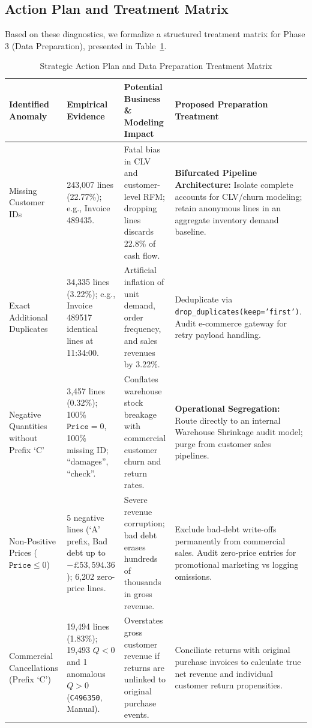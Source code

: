 \documentclass[journal,10pt,twocolumn]{IEEEtran}
\begin{document}
\subsection{Action Plan and Treatment Matrix}
Based on these diagnostics, we formalize a structured treatment matrix for Phase 3 (Data Preparation), presented in Table~\ref{tab:action_plan}.

\begin{table}[htbp]
\caption{Strategic Action Plan and Data Preparation Treatment Matrix}
\label{tab:action_plan}
\centering
\begin{tabularx}{\textwidth}{p{2.8cm}p{2.8cm}p{4.0cm}X}
\toprule
\textbf{Identified Anomaly} & \textbf{Empirical Evidence} & \textbf{Potential Business \& Modeling Impact} & \textbf{Proposed Preparation Treatment} \\
\midrule
Missing Customer IDs & 243,007 lines (22.77\%); e.g., Invoice 489435. & Fatal bias in CLV and customer-level RFM; dropping lines discards 22.8\% of cash flow. & \textbf{Bifurcated Pipeline Architecture:} Isolate complete accounts for CLV/churn modeling; retain anonymous lines in an aggregate inventory demand baseline. \\
\midrule
Exact Additional Duplicates & 34,335 lines (3.22\%); e.g., Invoice 489517 identical lines at 11:34:00. & Artificial inflation of unit demand, order frequency, and sales revenues by 3.22\%. & Deduplicate via \texttt{drop\_duplicates(keep='first')}. Audit e-commerce gateway for retry payload handling. \\
\midrule
Negative Quantities without Prefix `C' & 3,457 lines (0.32\%); 100\% $\texttt{Price} = 0$, 100\% missing ID; ``damages'', ``check''. & Conflates warehouse stock breakage with commercial customer churn and return rates. & \textbf{Operational Segregation:} Route directly to an internal Warehouse Shrinkage audit model; purge from customer sales pipelines. \\
\midrule
Non-Positive Prices ($\texttt{Price} \le 0$) & 5 negative lines (`A' prefix, Bad debt up to $-\pounds 53,594.36$); 6,202 zero-price lines. & Severe revenue corruption; bad debt erases hundreds of thousands in gross revenue. & Exclude bad-debt write-offs permanently from commercial sales. Audit zero-price entries for promotional marketing vs logging omissions. \\
\midrule
Commercial Cancellations (Prefix `C') & 19,494 lines (1.83\%); 19,493 $Q < 0$ and 1 anomalous $Q > 0$ (\texttt{C496350}, Manual). & Overstates gross customer revenue if returns are unlinked to original purchase events. & Conciliate returns with original purchase invoices to calculate true net revenue and individual customer return propensities. \\

\end{tabularx}
\end{table}
\end{document}
